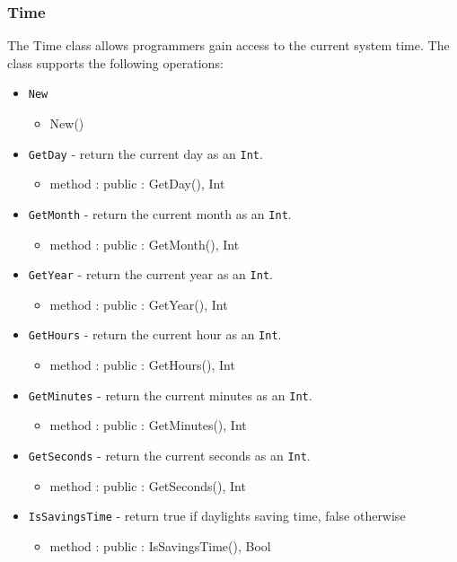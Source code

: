 \documentclass[12pt]{article}
\begin{document}
\subsubsection{Time}
The Time class allows programmers gain access to the current system time.    The class supports the following operations:
\begin{itemize}
    \item \texttt{New}
    	\begin{itemize}
	\item New()
	\end{itemize}
    \item \texttt{GetDay} - return the current day as an \texttt{Int}.
    	\begin{itemize}
	\item method : public : GetDay(), Int
	\end{itemize}
    \item \texttt{GetMonth} - return the current month as an \texttt{Int}.
    	\begin{itemize}
	\item method : public : GetMonth(), Int
	\end{itemize}
    \item \texttt{GetYear} - return the current year as an \texttt{Int}.
    	\begin{itemize}
	\item method : public : GetYear(), Int
	\end{itemize}
    \item \texttt{GetHours} - return the current hour as an \texttt{Int}.
    	\begin{itemize}
	\item method : public : GetHours(), Int
	\end{itemize}
    \item \texttt{GetMinutes} - return the current minutes as an \texttt{Int}.
    	\begin{itemize}
	\item method : public : GetMinutes(), Int
	\end{itemize}
    \item \texttt{GetSeconds} - return the current seconds as an \texttt{Int}.
    	\begin{itemize}
	\item method : public : GetSeconds(), Int
	\end{itemize}
    \item \texttt{IsSavingsTime} - return true if daylights saving time, false otherwise
    	\begin{itemize}
	\item method : public : IsSavingsTime(), Bool
	\end{itemize}
\end{itemize}
\end{document}
